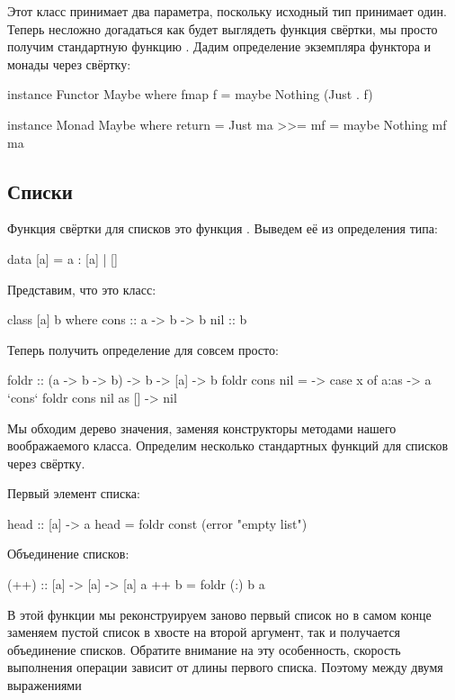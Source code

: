 Этот класс принимает два параметра, поскольку исходный
тип  принимает один. Теперь несложно догадаться
как будет выглядеть функция свёртки, мы просто получим
стандартную функцию . 
Дадим определение экземпляра функтора и монады через свёртку:

\begin{code}
instance Functor Maybe where
    fmap f = maybe Nothing (Just . f)

instance Monad Maybe where
    return      = Just
    ma >>= mf   = maybe Nothing mf ma
\end{code}

\subsection{Списки}

Функция свёртки для списков это функция . Выведем
её из определения типа:

\begin{code}
data [a] = a : [a] | []
\end{code}

Представим, что это класс:

\begin{code}
class [a] b where
    cons    :: a -> b -> b
    nil     :: b
\end{code}

Теперь получить определение для  совсем просто:

\begin{code}
foldr :: (a -> b -> b) -> b -> [a] -> b
foldr cons nil = \x -> case x of
    a:as    -> a `cons` foldr cons nil as
    []      -> nil    
\end{code}

Мы обходим дерево значения, заменяя конструкторы методами
нашего воображаемого класса. Определим несколько стандартных
функций для списков через свёртку.

Первый элемент списка:

\begin{code}
head :: [a] -> a
head = foldr const (error "empty list")
\end{code}

Объединение списков:

\begin{code}
(++) :: [a] -> [a] -> [a]
a ++ b = foldr (:) b a
\end{code}

В этой функции мы реконструируем заново первый список
но в самом конце заменяем пустой список в хвосте 
на второй аргумент, так и получается объединение списков.
Обратите внимание на эту особенность, скорость выполнения
операции \In{(++)} зависит от длины первого списка. 
Поэтому между двумя выражениями 

